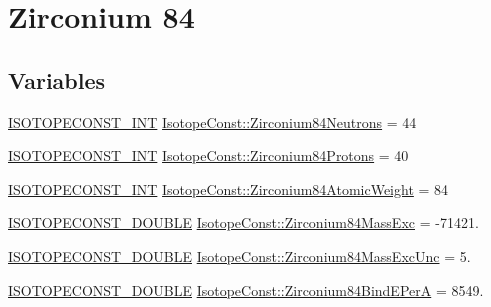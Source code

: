 \hypertarget{group___isotope_const-_zirconium-_zr84}{}\section{Zirconium 84}
\label{group___isotope_const-_zirconium-_zr84}
\subsection*{Variables}
\begin{DoxyCompactItemize}
\item 
\mbox{\hyperlink{group___isotope_const-_macros_ga5f18360b3e99483a35c32d789e62621c}{I\+S\+O\+T\+O\+P\+E\+C\+O\+N\+S\+T\+\_\+\+I\+NT}} \mbox{\hyperlink{group___isotope_const-_zirconium-_zr84_ga840e094d611418eb0bc6ddde79ae5a88}{Isotope\+Const\+::\+Zirconium84\+Neutrons}} = 44
\item 
\mbox{\hyperlink{group___isotope_const-_macros_ga5f18360b3e99483a35c32d789e62621c}{I\+S\+O\+T\+O\+P\+E\+C\+O\+N\+S\+T\+\_\+\+I\+NT}} \mbox{\hyperlink{group___isotope_const-_zirconium-_zr84_gaaba787de952b7749b95d6155382027dd}{Isotope\+Const\+::\+Zirconium84\+Protons}} = 40
\item 
\mbox{\hyperlink{group___isotope_const-_macros_ga5f18360b3e99483a35c32d789e62621c}{I\+S\+O\+T\+O\+P\+E\+C\+O\+N\+S\+T\+\_\+\+I\+NT}} \mbox{\hyperlink{group___isotope_const-_zirconium-_zr84_ga4d53ccb1722d96ecf4b55445ead63ced}{Isotope\+Const\+::\+Zirconium84\+Atomic\+Weight}} = 84
\item 
\mbox{\hyperlink{group___isotope_const-_macros_ga8f45a7272ce02c0b4c65c44636ed719a}{I\+S\+O\+T\+O\+P\+E\+C\+O\+N\+S\+T\+\_\+\+D\+O\+U\+B\+LE}} \mbox{\hyperlink{group___isotope_const-_zirconium-_zr84_gad121e9c9a33db2aadc21e7c1a68889f4}{Isotope\+Const\+::\+Zirconium84\+Mass\+Exc}} = -\/71421.
\item 
\mbox{\hyperlink{group___isotope_const-_macros_ga8f45a7272ce02c0b4c65c44636ed719a}{I\+S\+O\+T\+O\+P\+E\+C\+O\+N\+S\+T\+\_\+\+D\+O\+U\+B\+LE}} \mbox{\hyperlink{group___isotope_const-_zirconium-_zr84_gab92d05471481db1df0dd1ed2b8b0249b}{Isotope\+Const\+::\+Zirconium84\+Mass\+Exc\+Unc}} = 5.
\item 
\mbox{\hyperlink{group___isotope_const-_macros_ga8f45a7272ce02c0b4c65c44636ed719a}{I\+S\+O\+T\+O\+P\+E\+C\+O\+N\+S\+T\+\_\+\+D\+O\+U\+B\+LE}} \mbox{\hyperlink{group___isotope_const-_zirconium-_zr84_gae4913a92547f680cab681e8e32689858}{Isotope\+Const\+::\+Zirconium84\+Bind\+E\+PerA}} = 8549.
\item 

\end{DoxyCompactItemize}
